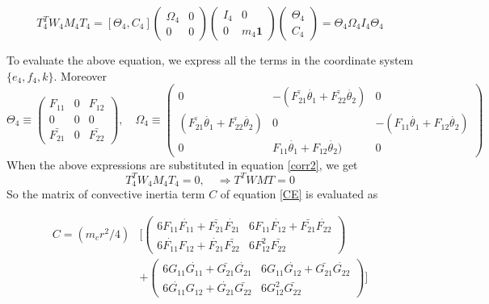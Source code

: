 \begin{equation}
\label{corr2}
T^T_4W_4M_4T_4=[\Theta_4, C_4]\begin{pmatrix}
\Omega_4 &0\\0&0
\end{pmatrix}
\begin{pmatrix}
I_4&0\\0 &m_4 \mathbf{1}
\end{pmatrix}
\begin{pmatrix}
\Theta_4\\C_4
\end{pmatrix}=\Theta_4\Omega_4I_4\Theta_4
\end{equation}

To evaluate the above equation, we express  all the terms in the coordinate system $\{{e_4,f_4,k}\}$. Moreover
\[\Theta_4 \equiv \begin{pmatrix}
F_{11}&0&F_{12}\\
0&0&0\\
\bar{F_{21}}&0&\bar{F_{22}}
\end{pmatrix}, \quad
 \Omega_4 \equiv \begin{pmatrix}
 0& -(\bar{F_{21}}\dot{\theta_1}+\bar{F_{22}}\dot{\theta_2}) &0\\
 (\bar{F_{21}}\dot{\theta_1}+\bar{F_{22}}\dot{\theta_2}) & 0 & -(F_{11}\dot{\theta_1}+F_{12}\dot{\theta_2}) \\
 0& F_{11}\dot{\theta_1}+F_{12}\dot{\theta_2}) &0 
 \end{pmatrix}
\]
When the above expressions are substituted in equation  \ref{corr2}, we get
\begin{equation}
T^T_4W_4M_4T_4=0, \quad \Rightarrow T^TWMT=0
\end{equation} 
So the matrix of convective inertia term $C$ of equation \ref{CE} is evaluated as 

\begin{equation}
\label{C_final}
\begin{split}
C=
(m_cr^2/4)& \biggl[ \begin{pmatrix}
6F_{11}\dot{F_{11}}+\bar{F_{21}}\dot{F_{21}} & 6F_{11}\dot{F_{12}}+\bar{F_{21}}\dot{F_{22}}\\
6\dot{F_{11}}F_{12}+\dot{F_{21}}\bar{F_{22}} & 6F_{12}^2\bar{F_{22}}
\end{pmatrix}\\
&+\begin{pmatrix}
6G_{11}\dot{G_{11}}+\bar{G_{21}}\dot{G_{21}} & 6G_{11}\dot{G_{12}}+\bar{G_{21}}\dot{G_{22}}\\
6\dot{G_{11}}G_{12}+\dot{G_{21}}\bar{G_{22}} & 6G_{12}^2\bar{G_{22}}
\end{pmatrix} \biggr]
\end{split}
\end{equation}

